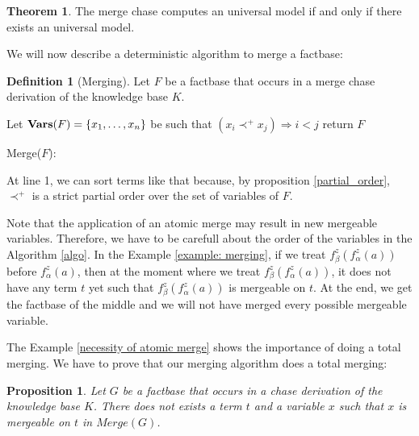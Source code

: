 \documentclass{article}
\newtheorem{proposition}{Proposition}[section]
\theoremstyle{definition}
\newtheorem{definition}{Definition}[section]
\newtheorem{theorem}{Theorem}[section]
\theoremstyle{remark}
\newcommand{\Vars}{\textbf{Vars}}
\newcommand{\Merge}{\textit{Merge}}
\begin{document}
\begin{theorem}
The merge chase computes an universal model if and only if there exists an universal model.
\end{theorem}

We will now describe a deterministic algorithm to merge a factbase:

\begin{definition}[Merging]
Let $F$ be a factbase that occurs in a merge chase derivation of the knowledge base $K$.

\begin{algorithm}[H] \label{algo}
\SetAlgoLined


    Let $\textbf{\Vars}(F) = \{x_1,\ldots, x_n\}$ be such that $(x_i \prec^+ x_j) \Rightarrow i < j$ \;
return $F$
\caption{Merge($F$):}


\end{algorithm}
At line 1, we can sort terms like that because, by proposition \ref{partial_order}, $\prec^+$ is a strict partial order over the set of variables of $F$.
\end{definition}



Note that the application of an atomic merge may result in new mergeable variables. Therefore, we have to be carefull about the order of the variables in the Algorithm \ref{algo}. In the Example \ref{example: merging}, if we treat $f_\beta^z(f_\alpha^z(a))$ before $f_\alpha^z(a)$, then at the moment where we treat $f_\beta^z(f_\alpha^z(a))$, it does not have any term $t$ yet such that $f_\beta^z(f_\alpha^z(a))$ is mergeable on $t$. At the end, we get the factbase of the middle and we will not have merged every possible mergeable variable.


The Example \ref{necessity of atomic merge} shows the importance of doing a total merging. We have to prove that our merging algorithm does a total merging:

\begin{proposition}\label{no_more_siblings}
Let $G$ be a factbase that occurs in a chase derivation of the knowledge base $K$. There does not exists a term $t$ and a variable $x$ such that $x$ is mergeable on $t$ in $\Merge(G)$.
\end{proposition}
\end{document}

